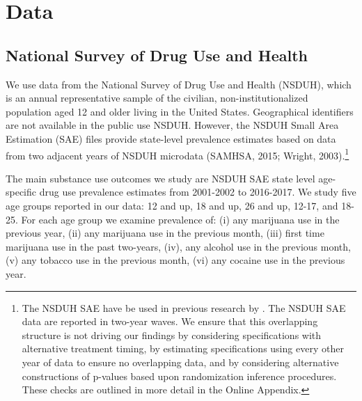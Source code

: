 \documentclass[12pt]{article}%
\begin{document}

\section{Data} 
\label{sec:Data}

\subsection{National Survey of Drug Use and Health}
\label{sec:data_nsduh}

We use data from the National Survey of Drug Use and Health (NSDUH), which is an annual representative sample of the civilian, non-institutionalized population aged 12 and older living in the United States. Geographical identifiers are not available in the public use NSDUH. However, the NSDUH Small Area Estimation (SAE) files provide state-level prevalence estimates based on data from two adjacent years of NSDUH microdata (SAMHSA, 2015; Wright, 2003).\footnote{The NSDUH SAE have be used in previous research by \cite{Choi2019,Friedman2015}. The NSDUH SAE data are reported in two-year waves. We ensure that this overlapping structure is not driving our findings by considering specifications with alternative treatment timing, by estimating specifications using every other year of data to ensure no overlapping data, and by considering alternative constructions of p-values based upon randomization inference procedures. These checks are outlined in more detail in the Online Appendix.} 
%

The main substance use outcomes we study are NSDUH SAE state level age-specific drug use prevalence estimates from 2001-2002 to 2016-2017. We study five age groups reported in our data:  12 and up, 18 and up, 26 and up, 12-17,  and 18-25. For each age group we examine prevalence of: (i) any marijuana use in the previous year, (ii) any marijuana use in the previous month, (iii) first time marijuana use in the past two-years, (iv), any alcohol use in the previous month, (v) any tobacco use in the previous month, (vi) any cocaine use in the previous year. 
\end{document}
